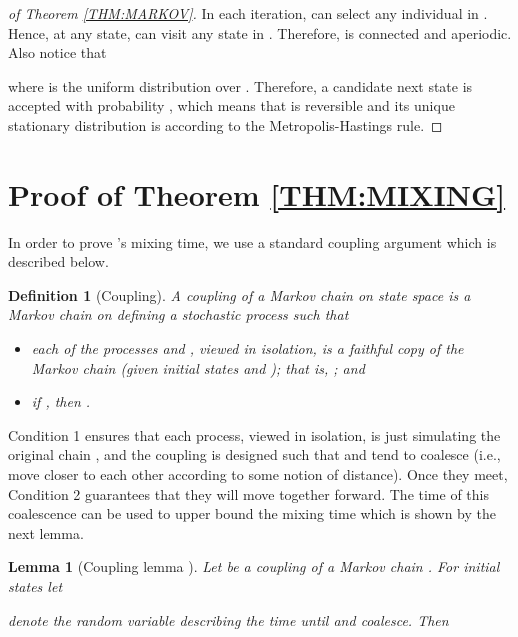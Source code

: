 \documentclass{acm_proc_article-sp}
\theoremstyle{plain}
\newtheorem{definition}{Definition}
\theoremstyle{plain}
\theoremstyle{plain}
\theoremstyle{plain}
\theoremstyle{plain}
\newtheorem{lemma}{Lemma}
\theoremstyle{plain}
\begin{document}
\begin{proof}[of Theorem \ref{THM:MARKOV}]
In each iteration,  can select any individual  in .  Hence, at any state,  can visit any state in . Therefore,  is connected and aperiodic. Also notice that 

where  is the uniform distribution over . Therefore, a candidate next state is accepted with probability , which means that
 is reversible and its unique stationary distribution is  according to the Metropolis-Hastings rule.
\end{proof}

\section{Proof of Theorem \ref{THM:MIXING}}


In order to prove 's mixing time, we use a standard coupling argument which is described below.

\begin{definition}[Coupling]
\label{def:coupling}
A coupling of a Markov chain  on state space  is a Markov chain on  defining a stochastic process   such that
\begin{itemize}
\item each of the processes  and , viewed in isolation, is a faithful copy of the Markov chain  (given initial states  and ); that is, ;
and
\item if , then .
\end{itemize}
\end{definition}

Condition 1 ensures that each process, viewed in isolation, is just simulating the original chain , and the coupling is designed such that  and  tend to coalesce (i.e., move closer to each other according to some notion of distance). Once they meet, Condition 2 guarantees that they will move together forward. The time of this coalescence can be used to upper bound the mixing time which is shown by the next lemma.

\begin{lemma}[Coupling lemma \cite{LevinPW09mixing}]
\label{lem:coupling}
Let  be a coupling of a Markov chain . 
For initial states  let

denote the random variable describing the time until  and  coalesce. Then

\end{lemma}
\end{document}
